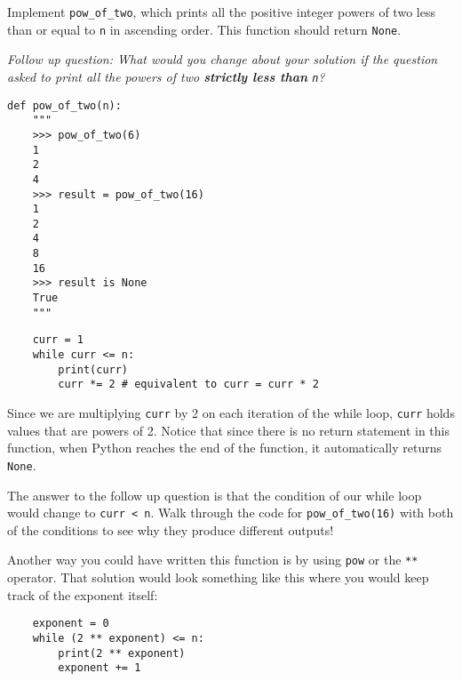 \begin{blocksection}
\question Implement \lstinline{pow_of_two}, which prints all the positive integer powers of two less than or equal to \lstinline{n} in ascending order. This function should return \lstinline{None}.

\emph{Follow up question: What would you change about your solution if the question asked to print all the powers of two \textbf{strictly less than} \lstinline{n}?}

\begin{lstlisting}
def pow_of_two(n):
    """
    >>> pow_of_two(6)
    1 
    2 
    4 
    >>> result = pow_of_two(16)
    1
    2
    4
    8
    16
    >>> result is None
    True
    """
\end{lstlisting}
\begin{solution}[2in]
\begin{lstlisting}
    curr = 1
    while curr <= n:
        print(curr)
        curr *= 2 # equivalent to curr = curr * 2
\end{lstlisting}
Since we are multiplying \lstinline{curr} by 2 on each iteration of the while loop, \lstinline{curr} holds values that are powers of 2.
Notice that since there is no return statement in this function, when Python reaches the end of the function, it automatically returns \lstinline{None}.

The answer to the follow up question is that the condition of our while loop would change to \lstinline{curr < n}.
Walk through the code for \lstinline$pow_of_two(16)$ with both of the conditions to see why they produce different outputs!

Another way you could have written this function is by using \lstinline{pow} or the \lstinline{**} operator. That solution would look something like this where you would keep track of the exponent itself:

\begin{lstlisting}
    exponent = 0
    while (2 ** exponent) <= n:
        print(2 ** exponent)
        exponent += 1
\end{lstlisting}
\end{solution}
\end{blocksection}